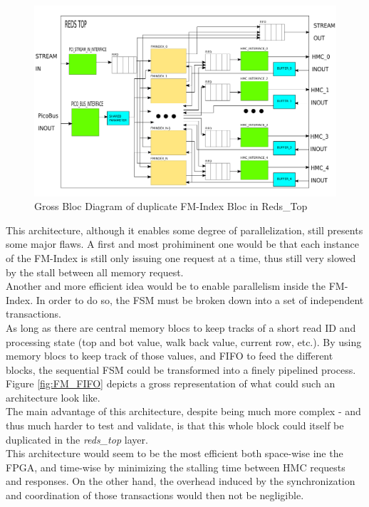 \begin{figure}[H]
    \centering
    \includegraphics [scale = 0.4]{Figures/FMINDEX_DUPL_DIAG.png}
    \caption{Gross Bloc Diagram of duplicate FM-Index Bloc in Reds\_Top}
    \label{fig:FM_DUPL}
\end{figure}

This architecture, although it enables some degree of parallelization, still presents some major flaws. A first and most prohiminent one would be that each instance of the FM-Index is still only issuing one request at a time, thus still very slowed by the stall between all memory request. \\


Another and more efficient idea would be to enable parallelism inside the FM-Index. In order to do so, the FSM must be broken down into a set of independent transactions. \\
As long as there are central memory blocs to keep tracks of a short read ID and processing state (top and bot value, walk back value, current row, etc.). By using memory blocs to keep track of those values, and FIFO to feed the different blocks, the sequential FSM could be transformed into a finely pipelined process. Figure \ref{fig:FM_FIFO} depicts a gross representation of what could such an architecture look like. \\

The main advantage of this architecture, despite being much more complex - and thus much harder to test and validate, is that this whole block could itself be duplicated in the \textit{reds\_top} layer. \\

This architecture would seem to be the most efficient both space-wise ine the FPGA, and time-wise by minimizing the stalling time between HMC requests and responses. On the other hand, the overhead induced by the synchronization and coordination of those transactions would then not be negligible.

